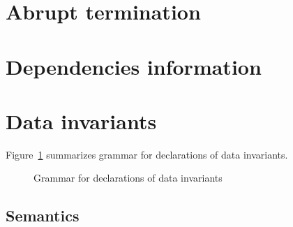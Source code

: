 
\section{Abrupt termination}
\absent


\section{Dependencies information}
\absent


\section{Data invariants}
\label{sec:invariants}

\nodiff

Figure~\ref{fig:gram:datainvariants} summarizes grammar for declarations of data
invariants.
\begin{figure}[htbp]
  \caption{Grammar for declarations of data invariants}
\label{fig:gram:datainvariants}
\end{figure}


\subsection{Semantics}
\nodiff

